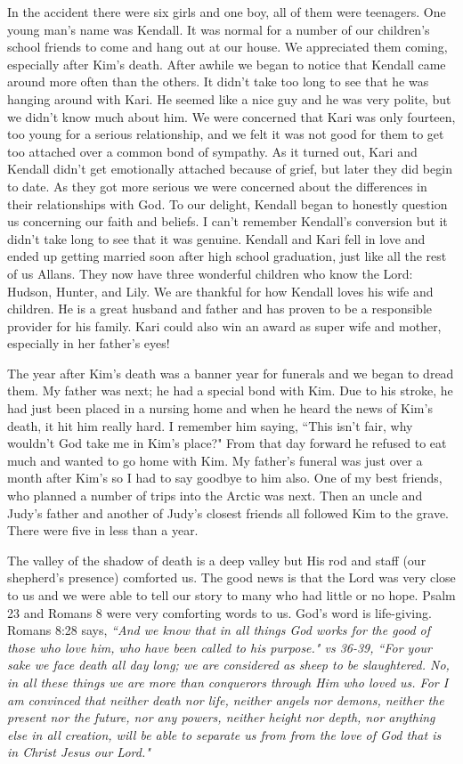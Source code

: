 \documentclass[oneside,12pt]{book}
\begin{document}
In the accident there were six girls and one boy, all of them were teenagers. One young man's name was Kendall. It was normal for a number of our children's school friends to come and hang out at our house. We appreciated them coming, especially after Kim's death. After awhile we began to notice that Kendall came around more often than the others. It didn't take too long to see that he was hanging around with Kari. He seemed like a nice guy and he was very polite, but we didn't know much about him. We were concerned that Kari was only fourteen, too young for a serious relationship, and we felt it was not good for them to get too attached over a common bond of sympathy. As it turned out, Kari and Kendall didn't get emotionally attached because of grief, but later they did begin to date. As they got more serious we were concerned about the differences in their relationships with God. To our delight, Kendall began to honestly question us concerning our faith and beliefs. I can't remember Kendall's conversion but it didn't take long to see that it was genuine. Kendall and Kari fell in love and ended up getting married soon after high school graduation, just like all the rest of us Allans. They now have three wonderful children who know the Lord: Hudson, Hunter, and Lily. We are thankful for how Kendall loves his wife and children. He is a great husband and father and has proven to be a responsible provider for his family. Kari could also win an award as super wife and mother, especially in her father's eyes!

The year after Kim's death was a banner year for funerals and we began to dread them. My father was next; he had a special bond with Kim. Due to his stroke, he had just been placed in a nursing home and when he heard the news of Kim's death, it hit him really hard. I remember him saying, ``This isn't fair, why wouldn't God take me in Kim's place?" From that day forward he refused to eat much and wanted to go home with Kim. My father's funeral was just over a month after Kim's so I had to say goodbye to him also. One of my best friends, who planned a number of trips into the Arctic was next. Then an uncle and Judy's father and another of Judy's closest friends all followed Kim to the grave. There were five in less than a year. 

The valley of the shadow of death is a deep valley but His rod and staff (our shepherd's presence) comforted us. The good news is that the Lord was very close to us and we were able to tell our story to many who had little or no hope. Psalm 23 and Romans 8 were very comforting words to us. God's word is life-giving. Romans 8:28 says, \textit{``And we know that in all things God works for the good of those who love him, who have been called to his purpose." vs 36-39, ``For your sake we face death all day long; we are considered as sheep to be slaughtered. No, in all these things we are more than conquerors through Him who loved us. For I am convinced that neither death nor life, neither angels nor demons, neither the present nor the future, nor any powers, neither height nor depth, nor anything else in all creation, will be able to separate us from from the love of God that is in Christ Jesus our Lord."}
\end{document}
